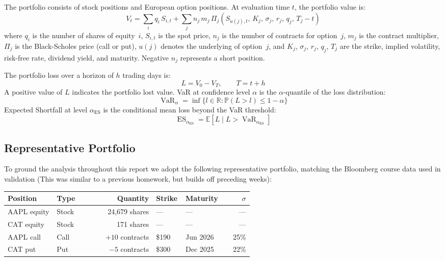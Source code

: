 \documentclass[11pt]{article}
\DeclareMathOperator{\VaR}{VaR}
\DeclareMathOperator{\ES}{ES}
\newcommand{\E}{\mathbb{E}}
\newcommand{\Prob}{\mathbb{P}}
\begin{document}
The portfolio consists of stock positions and European option positions.  At
evaluation time $t$, the portfolio value is:
\begin{equation}
  V_t = \sum_{i} q_i\, S_{i,t}
      + \sum_{j} n_j\, m_j\,
        \Pi_j\!\left(S_{u(j),t},\, K_j,\, \sigma_j,\, r_j,\, q_j,\, T_j - t\right)
  \label{eq:portfolio_value}
\end{equation}
where $q_i$ is the number of shares of equity~$i$, $S_{i,t}$ is the spot
price, $n_j$ is the number of contracts for option~$j$, $m_j$ is the contract
multiplier, $\Pi_j$ is the Black-Scholes price (call or put), $u(j)$ denotes
the underlying of option~$j$, and $K_j$, $\sigma_j$, $r_j$, $q_j$, $T_j$ are
the strike, implied volatility, risk-free rate, dividend yield, and maturity.
Negative $n_j$ represents a short position.

The portfolio loss over a horizon of $h$ trading days is:
\begin{equation}
  L = V_0 - V_T, \qquad T = t + h
  \label{eq:loss}
\end{equation}
A positive value of $L$ indicates the portfolio lost value.  VaR at confidence
level $\alpha$ is the $\alpha$-quantile of the loss distribution:
\begin{equation}
  \VaR_\alpha = \inf\bigl\{l \in \mathbb{R} : \Prob(L > l) \leq 1 - \alpha\bigr\}
  \label{eq:var_def}
\end{equation}
Expected Shortfall at level $\alpha_{\mathrm{ES}}$ is the conditional mean loss
beyond the VaR threshold:
\begin{equation}
  \ES_{\alpha_{\mathrm{ES}}} = \E\!\left[L \;\big|\; L > \VaR_{\alpha_{\mathrm{ES}}}\right]
  \label{eq:es_def}
\end{equation}

\subsection{Representative Portfolio}

To ground the analysis throughout this report we adopt the following
representative portfolio, matching the Bloomberg course data used in
validation (This was similar to a previous homework, but builds off preceding weeks):

\begin{center}
\begin{tabular}{@{}L{0.20\linewidth}L{0.12\linewidth}r
                  L{0.12\linewidth}L{0.12\linewidth}r@{}}
\toprule
Position & Type & Quantity & Strike & Maturity & $\sigma$ \\
\midrule
AAPL equity  & Stock & 24{,}679 shares  & ---    & ---      & ---  \\
CAT equity   & Stock & 171 shares       & ---    & ---      & ---  \\
AAPL call    & Call  & $+10$ contracts  & \$190  & Jun 2026 & 25\% \\
CAT put      & Put   & $-5$ contracts   & \$300  & Dec 2025 & 22\% \\
\bottomrule
\end{tabular}
\end{center}
\end{document}
